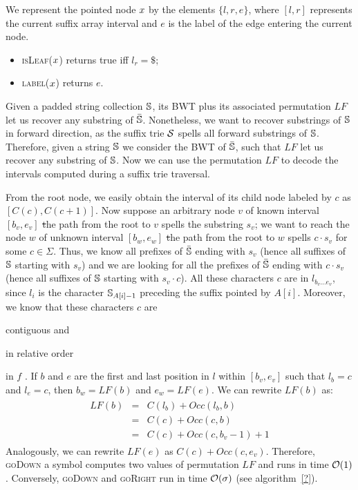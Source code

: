 We represent the pointed node $x$ by the elements $\{ l, r, e \}$, where $[l,r]$ represents the current suffix array interval and $e$ is the label of the edge entering the current node.
\begin{itemize}
\item \textsc{isLeaf}($x$) returns true iff $l_r = \$$;
\item \textsc{label}($x$) returns $e$.
\end{itemize}

Given a padded string collection $\mathbb {S}$, its BWT plus its associated permutation $LF$ let us recover any substring of $\bar{\mathbb {S}}$.
Nonetheless, we want to recover substrings of $\mathbb {S}$ in forward direction, as the suffix trie $\mathcal {S}$ spells all forward substrings of $\mathbb {S}$.
Therefore, given a string $\mathbb {S}$ we consider the BWT of $\bar{\mathbb {S}}$, such that $LF$ let us recover any substring of $\mathbb {S}$.
Now we can use the permutation $LF$ to decode the intervals computed during a suffix trie traversal.

From the root node, we easily obtain the interval of its child node labeled by $c$ as $[C(c),C(c+1)]$.
Now suppose an arbitrary node $v$ of known interval $[b_v, e_v]$ \st the path from the root to $v$ spells the substring $s_v$;
we want to reach the node $w$ of unknown interval $[b_w, e_w]$ \st the path from the root to $w$ spells $c \cdot s_v$ for some $c \in \Sigma$.
Thus, we know all prefixes of $\bar{\mathbb {S}}$ ending with $s_v$ (hence all suffixes of $\mathbb {S}$ starting with $s_v$) and we are looking for all the prefixes of $\bar{\mathbb {S}}$ ending with $c \cdot s_v$ (hence all suffixes of $\mathbb {S}$ starting with $s_v \cdot c$).
All these characters $c$ are in $l_{b_v \dots e_v}$, since $l_i$ is the character $\mathbb {S}_{A[i] - 1}$ preceding the suffix pointed by $A[i]$.
Moreover, we know that these characters $c$ are
\begin{inparaenum}[(i)]
\item contiguous and
\item in relative order
\end{inparaenum}
in $f$ \citep{Ferragina2000}.
If $b$ and $e$ are the first and last position in $l$ within $[b_v, e_v]$ such that $l_b = c$ and $l_e = c$, then $b_w = LF(b)$ and $e_w = LF(e)$.
We can rewrite $LF(b)$ as:
\begin{eqnarray}
\begin{array}{lcl}
LF(b) &=& C(l_b) + Occ(l_b, b)\\
 	  &=& C(c) + Occ(c, b)\\
	  &=& C(c) + Occ(c, b_v - 1) + 1
\end{array}
\end{eqnarray}
Analogously, we can rewrite $LF(e)$ as $C(c) + Occ(c, e_v)$.
Therefore, \textsc{goDown} a symbol computes two values of permutation $LF$ and runs in time $\mathcal{O}(1)$.
Conversely, \textsc{goDown} and \textsc{goRight} run in time $\mathcal{O}(\sigma)$ (see algorithm~\ref{?}).

